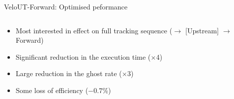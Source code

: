 \documentclass[aspectratio=1610]{beamer}
\begin{document}
\begin{frame}{VeloUT-Forward: Optimised peformance}

\begin{columns}
\begin{column}{0.65\textwidth}

\begin{itemize}
  \item[] Most interested in effect on full tracking sequence (\velo $\to$ [Upstream] $\to$ Forward)
\end{itemize}

\begin{itemize}
  \item Significant reduction in the execution time ($\times$4)
  \item Large reduction in the ghost rate ($\times$3)
  \item Some loss of efficiency ($-0.7$\%)
\end{itemize}

\bigskip

\begin{mdframed}[linecolor=barcolor]
\begin{center}
\end{center}
\end{mdframed}
\end{column}


\end{columns}
\end{frame}
\end{document}
